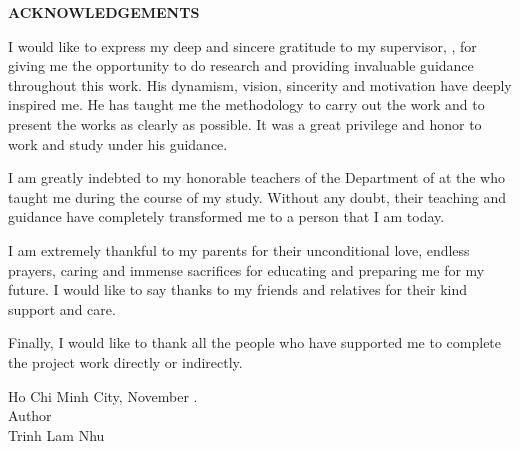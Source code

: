 \begin{center}
    \large{\MakeUppercase{\textbf{Acknowledgements}}}
\end{center}
    \vspace{1\baselineskip}
    I would like to express my deep and sincere gratitude to my supervisor, \emph{\gvhd}, for giving me the opportunity to do research and providing invaluable guidance throughout this work. His dynamism, vision, sincerity and motivation have deeply inspired me. He has taught me the methodology to carry out the work and to present the works as clearly as possible. It was a great privilege and honor to work and study under his guidance. 

I am greatly indebted to my honorable teachers of the Department of \khoa at the \university who taught  me during the course of my study. Without any doubt, their teaching and guidance have completely transformed me to a person that I am today.

I am extremely thankful to my parents for their unconditional love, endless prayers, caring and immense sacrifices for educating and preparing me for my future. I would like to say thanks to my friends and relatives for their kind support and care.

Finally, I would like to thank all the people who have supported me to complete the project work directly or indirectly.
    \begin{center}
	\hspace*{7cm}Ho Chi Minh City, November  \nam.\\
	\hspace*{7cm}Author\\
	\vspace*{0.2cm}
	\vspace*{2cm}
	\hspace*{7cm}Trinh Lam Nhu
\end{center}